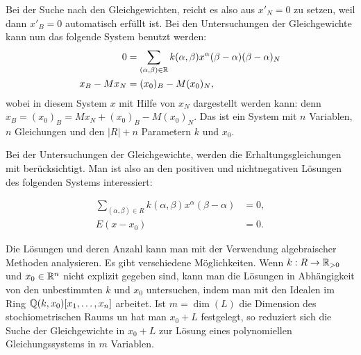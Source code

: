 \documentclass[11pt]{article}
\numberwithin{equation}{section}
\begin{document}
Bei der Suche nach den Gleichgewichten, reicht es also aus $x'_N=0$ zu setzen, weil dann $x'_B = 0$ automatisch erfüllt ist. Bei den Untersuchungen der Gleichgewichte kann nun das folgende System benutzt werden: 
\begin{align*}
		0 & = \sum_{(\alpha,\beta) \in \mathbb{R}} k(\alpha,\beta) x^\alpha  (\beta-\alpha) (\beta-\alpha)_N
		\\ x_B - M x_N & = (x_0)_B - M (x_0)_N,
\end{align*}
wobei in diesem System $x$ mit Hilfe von $x_N$ dargestellt werden kann: denn $x_B = (x_0)_B  = M x_N + (x_0)_B - M(x_0)_N$. Das ist ein System mit $n$ Variablen, $n$ Gleichungen und den $|R|+n$ Parametern $k$ und $x_0$. 


\hrulefill 

Bei der Untersuchungen der Gleichgewichte, werden die Erhaltungsgleichungen mit berücksichtigt. Man ist also an den positiven und nichtnegativen Lösungen des folgenden Systems interessiert:

\begin{align*}
		\sum_{(\alpha,\beta) \in R} k(\alpha,\beta) x^\alpha (\beta - \alpha) & = 0 ,
	\\	E (x-x_0) & = 0.
\end{align*}

Die Lösungen und deren Anzahl kann man mit der Verwendung algebraischer Methoden analysieren.  Es gibt verschiedene Möglichkeiten. Wenn $k : R \to \mathbb{R}_{>0}$ und $x_0 \in \mathbb{R}^n$ nicht explizit gegeben sind, kann man die Lösungen in Abhängigkeit von den unbestimmten $k$ und $x_0$ untersuchen, indem man mit den Idealen im Ring $\mathbb{Q}(k,x_0) [x_1,\ldots,x_n]$ arbeitet. Ist $m = \dim(L)$ die Dimension des stochiometrischen Raums un hat man $x_0+L$ festgelegt, so reduziert sich die Suche der Gleichgewichte in $x_0+L$ zur Lösung eines polynomiellen Gleichungssystems in $m$ Variablen. 
\end{document}
